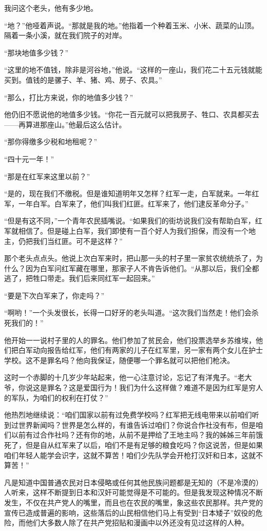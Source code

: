 \documentclass[10pt]{book}
\begin{document}
我问这个老头，他有多少地。

“地？”他哑着声说。“那就是我的地。”他指着一个种着玉米、小米、蔬菜的山顶。隔着一条小溪，就在我们院子的对岸。

“那块地值多少钱？”

“这里的地不值钱，除非是河谷地，”他说。“这样的一座山，我们花二十五元钱就能买到。值钱的是骡子、羊、猪、鸡、房子、农具。”

“那么，打比方来说，你的地值多少钱？”

他仍旧不愿说他的地值多少钱。“你花一百元就可以把我房子、牲口、农具都买去——再算进那座山。”他最后这么估计。

“那你得缴多少税和地租呢？”

“四十元一年！”

“那是在红军来这里以前？”

“是的，现在我们不缴税。但是谁知道明年又怎样？红军一走，白军就来。一年红军，一年白军。白军来了，他们叫我们红匪。红军来了，他们逮反革命分子。”

“但是有这不同，”一个青年农民插嘴说。“如果我们的街坊说我们没有帮助白军，红军就相信了。但是碰上白军，我们即使有一百个好人为我们担保，而没有一个地主，仍把我们当红匪。可不是这样？”

那个老头点点头。他说上次白军来时，把山那一头的村子里一家贫农统统杀了，为什么？因为白军问红军藏在哪里，那家子人不肯告诉他们。“从那以后，我们全都逃了，把牲口带走。我们后来同红军一起回来。”

“要是下次白军来了，你走吗？”

“啊哟！”一个头发很长，长得一口好牙的老头叫道。“这次我们当然走！他们会杀死我们的！”

他开始一一说村子里的人的罪名。他们参加了贫民会，他们投票选举乡苏维埃，他们把白军动向报告给红军，他们有两家的儿子在红军里，另一家有两个女儿在护士学校。这不是罪名吗？他向我保证，随便哪一个罪名就可以把他们枪决。

这时一个赤脚的十几岁少年站起来，他一心注意讨论，忘记了有洋鬼子。“老大爷，你说这是罪名？这是爱国行为！我们为什么这样做？难道不是因为红军是穷人的军队，为咱们的权利在打仗？”

他热烈地继续说：“咱们国家以前有过免费学校吗？红军把无线电带来以前咱们听到过世界新闻吗？世界是怎么样的，有谁告诉过咱们？你说合作社没有布，但是咱们以前有过合作社吗？还有你的地，从前不是押给了王地主吗？我的姊姊三年前饿死了，但是自从红军来了以后，咱们不是有足够的粮食吃吗？你这说苦，但是如果咱们年轻人能学会识字，这就不算苦！咱们少先队学会开枪打汉奸和日本，这就不算苦！”

凡是知道中国普通农民对日本侵略或任何其他民族问题都是无知的（不是冷漠的）人听来，这样不断提到日本和汉奸可能觉得是不可能的。但是我发现这种情况不断发生，不仅在共产党人的嘴里，而且也在农民的嘴里，象这些农民那样。共产党的宣传已造成普遍的影响，这些落后的山民相信他们马上有受到“日本矮子”奴役的危险，而他们大多数人除了在共产党招贴和漫画中以外还没有见过这样的人种。
\end{document}
